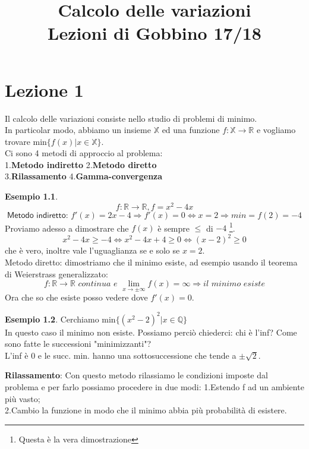 \documentclass[a4paper]{book}
\title{Calcolo delle variazioni \\ \small{Lezioni di Gobbino 17/18} }
\author{}
\theoremstyle{definition}
\newtheorem{ex}{Esempio}
\theoremstyle{remark}
\theoremstyle{definition}
\newcommand{\bbx}{\mathbb{X}}
\newcommand{\bbr}{\mathbb{R}}
\newcommand{\ra}{\Rightarrow}
\begin{document}
\maketitle
\chapter{Lezione 1}
Il calcolo delle variazioni consiste nello studio di problemi di minimo.
\\
In particolar modo, abbiamo un insieme $\bbx$ ed una funzione $f:\bbx \to \bbr$ e vogliamo trovare min$\{f(x)|x \in \bbx\}$.
\\
Ci sono 4 metodi di approccio al problema:
\\
1.\textbf{Metodo indiretto}	\hspace{3mm}2.\textbf{Metodo diretto} \\
3.\textbf{Rilassamento}	\hspace{3mm}	4.\textbf{Gamma-convergenza}

\begin{ex}
\[
	f:\bbr \to \bbr, f = x^2 - 4x
\]
\[
	\textsf{Metodo indiretto: }f'(x) = 2x - 4 \ra f'(x) = 0 \iff x = 2 \ra \textit{min} = f(2) = -4
\]
Proviamo adesso a dimostrare che $f(x)$ è sempre $\leq$ di $-4$ \footnote{Questa è la vera dimostrazione}.
\[
	x^2 - 4x \ge -4 \iff x^2 -4x + 4 \ge 0 \iff (x -2)^2 \ge 0 
\]
che è vero, inoltre vale l'uguaglianza se e solo se $x = 2$. \\
Metodo diretto: dimostriamo che il minimo esiste, ad esempio usando il teorema di Weierstrass generalizzato:
\[
	f: \bbr \to \bbr \textit{ continua e } \lim_{x \to \pm\infty}f(x) = \infty \ra \textit{il minimo esiste}
\]
Ora che so che esiste posso vedere dove $f'(x) = 0$.
\end{ex}

\begin{ex}
	Cerchiamo min$\{(x^2 - 2)^2 | x \in \mathbb{Q} \}$ \\
	In questo caso il minimo non esiste. Possiamo perciò chiederci: chi è l'inf? Come sono fatte le successioni "minimizzanti"?\\
	L'inf è 0 e le succ. min. hanno una sottosuccessione che tende a $\pm \sqrt 2$.
\end{ex}
\noindent
\textbf{Rilassamento}: Con questo metodo rilassiamo le condizioni imposte dal problema e per farlo possiamo procedere in due modi:
1.Estendo f ad un ambiente più vasto; \\
2.Cambio la funzione in modo che il minimo abbia più probabilità di esistere.	
\end{document}
